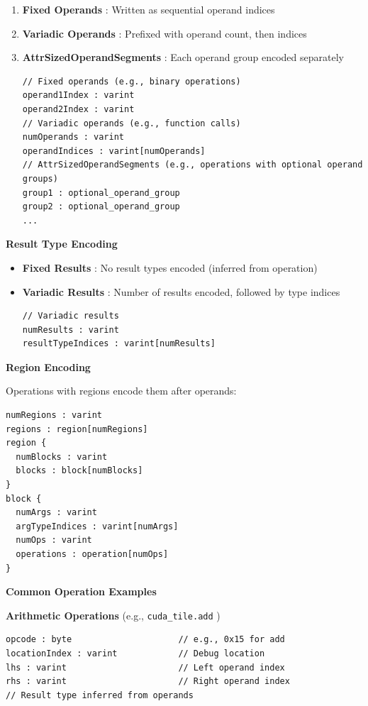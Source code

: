\documentclass{article}
\begin{document}
\begin{enumerate}
\item \textbf{Fixed Operands} : Written as sequential operand indices
\item \textbf{Variadic Operands} : Prefixed with operand count, then indices
\item \textbf{AttrSizedOperandSegments} : Each operand group encoded separately

\begin{lstlisting}
// Fixed operands (e.g., binary operations)
operand1Index : varint
operand2Index : varint
// Variadic operands (e.g., function calls)
numOperands : varint
operandIndices : varint[numOperands]
// AttrSizedOperandSegments (e.g., operations with optional operand groups)
group1 : optional_operand_group
group2 : optional_operand_group
...
\end{lstlisting}

\end{enumerate}
\textbf{Result Type Encoding}


\begin{itemize}
\item \textbf{Fixed Results} : No result types encoded (inferred from operation)
\item \textbf{Variadic Results} : Number of results encoded, followed by type indices

\begin{lstlisting}
// Variadic results
numResults : varint
resultTypeIndices : varint[numResults]
\end{lstlisting}

\end{itemize}
\textbf{Region Encoding}


Operations with regions encode them after operands:


\begin{lstlisting}
numRegions : varint
regions : region[numRegions]
region {
  numBlocks : varint
  blocks : block[numBlocks]
}
block {
  numArgs : varint
  argTypeIndices : varint[numArgs]
  numOps : varint
  operations : operation[numOps]
}
\end{lstlisting}

\textbf{Common Operation Examples}


\textbf{Arithmetic Operations} (e.g., \texttt{cuda\_tile.add} )


\begin{lstlisting}
opcode : byte                     // e.g., 0x15 for add
locationIndex : varint            // Debug location
lhs : varint                      // Left operand index
rhs : varint                      // Right operand index
// Result type inferred from operands
\end{lstlisting}
\end{document}
